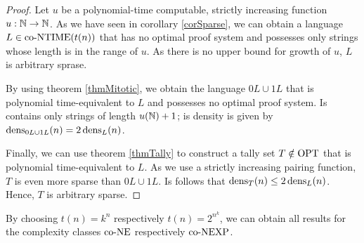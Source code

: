   \begin{proof}
    Let \(u\) be a polynomial-time computable, strictly increasing function \(u:\mathbb{N}\to\mathbb{N}\). As we have seen in corollary \ref{corSparse}, we can obtain a language \(L \in \text{co-NTIME}(t(n))\) that has no optimal proof system and possesses only strings whose length is in the range of \(u\). As there is no upper bound for growth of \(u\), \(L\) is arbitrary sprase. 
    
    By using theorem \ref{thmMitotic}, we obtain the language \(0L \cup 1L\) that is polynomial time-equivalent to \(L\) and possesses no optimal proof system. Is contains only strings of length \(u(\mathbb{N}) + 1\); is density is given by \(\operatorname{dens}_{0L \cup 1L}(n) = 2\operatorname{dens}_{L}(n)\). 
    
    Finally, we can use theorem \ref{thmTally} to construct a tally set \(T \notin \text{OPT}\) that is polynomial time-equivalent to \(L\). As we use a strictly increasing pairing function, \(T\) is even more sparse than \(0L \cup 1L\). Is follows that \(\operatorname{dens}_T(n) \leq 2\operatorname{dens}_L(n)\). Hence, \(T\) is arbitrary sparse.
  \end{proof}
  
  By choosing \(t(n) = k^n\) respectively \(t(n) = 2^{n^k}\), we can obtain all results for the complexity classes \(\text{co-NE}\) respectively \(\text{co-NEXP}\).



 

  